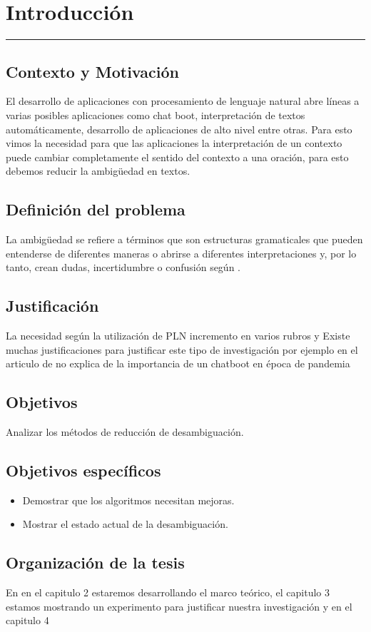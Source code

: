 \chapter{Introducción}
\hrule \bigskip \vspace*{1cm}
\section{Contexto y Motivación}
El desarrollo de aplicaciones con procesamiento de lenguaje natural abre líneas a varias posibles aplicaciones como chat boot, interpretación de textos automáticamente, desarrollo de aplicaciones de alto nivel entre otras. Para esto vimos la necesidad para que las aplicaciones la interpretación de un contexto puede cambiar completamente el sentido del contexto a una oración, para esto debemos reducir la ambigüedad en textos.

\section{Definición del problema}
La ambigüedad se refiere a términos que son estructuras gramaticales que pueden entenderse de diferentes maneras o abrirse a diferentes interpretaciones y, por lo tanto, crean dudas, incertidumbre o confusión según \cite{EvaluacionAmbiguedad01}.

\section{Justificación}
La necesidad según \cite{Arquitectura} la utilización de PLN incremento en varios rubros y 
Existe muchas justificaciones para justificar este tipo de investigación por ejemplo en el articulo de \cite{ChatBoot} no explica de la importancia de un chatboot en época de pandemia


\section{Objetivos}

 Analizar los métodos de reducción de desambiguación.

\section{Objetivos específicos}
 
\begin{itemize}
  \item Demostrar que los algoritmos necesitan mejoras. 
  \item Mostrar el estado actual de la desambiguación. 
\end{itemize}

\section{Organización de la tesis}

En en el capitulo 2 estaremos desarrollando el marco teórico, el capitulo 3 estamos mostrando un experimento para justificar nuestra investigación y en el capitulo 4 
